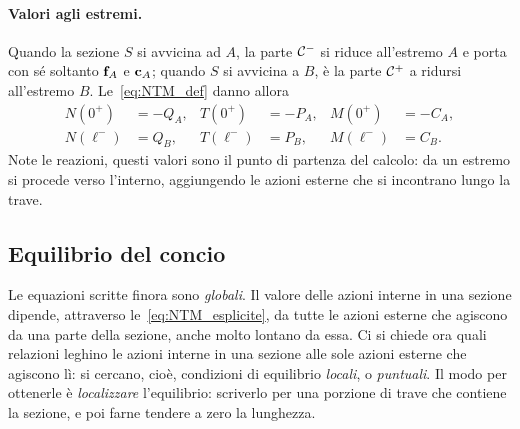 \paragraph{Valori agli estremi.}
Quando la sezione $S$ si avvicina ad $A$, la parte
$\mathcal{C}^-$ si riduce all'estremo $A$ e porta con sé soltanto
$\mathbf{f}_A$ e $\mathbf{c}_A$; quando $S$ si avvicina a $B$, è la
parte $\mathcal{C}^+$ a ridursi all'estremo $B$. Le~\eqref{eq:NTM_def}
danno allora
\begin{align}
	N(0^+) &= -Q_A, & T(0^+) &= -P_A, & M(0^+) &= -C_A,
	\label{eq:cc_sinistra}\\
	N(\ell^-) &= Q_B, & T(\ell^-) &= P_B, & M(\ell^-) &= C_B.
	\label{eq:cc_destra}
\end{align}
Note le reazioni, questi valori sono il punto di partenza
del calcolo: da un estremo si procede verso l'interno,
aggiungendo le azioni esterne che si incontrano lungo la
trave.



\subsection{Equilibrio del concio}
\label{sec:equilibrio_concio}

Le equazioni scritte finora sono \emph{globali}. Il
valore delle azioni interne in una sezione dipende,
attraverso le~\eqref{eq:NTM_esplicite}, da tutte le azioni
esterne che agiscono da una parte della sezione, anche
molto lontano da essa. Ci si chiede ora quali relazioni
leghino le azioni interne in una sezione alle sole azioni
esterne che agiscono lì: si cercano, cioè, condizioni di
equilibrio \emph{locali}, o \emph{puntuali}. Il modo per
ottenerle è \emph{localizzare} l'equilibrio: scriverlo
per una porzione di trave che contiene la sezione, e poi
farne tendere a zero la lunghezza.

